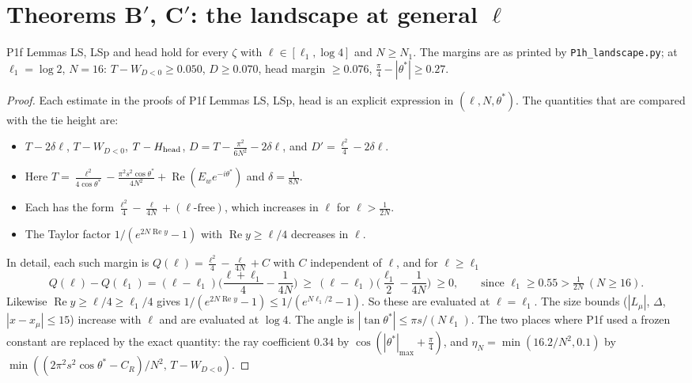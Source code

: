 \documentclass[11pt]{article}
\theoremstyle{remark}\newtheorem{remark}[theorem]{Remark}
\begin{document}
\section{Theorems B$'$, C$'$: the landscape at general $\ell$}\label{sec:LS}
\begin{lemma}[LS$(\ell_1)$; PROVED for $(\ell_1,N)=(\log2,\,N\ge16)$ and $(0.5522,\,N\ge17)$, computer-assisted]\label{lem:LS}
P1f Lemmas LS, LSp and head hold for every $\zeta$ with $\ell\in[\ell_1,\log4]$ and $N\ge N_1$. The margins are as printed by \texttt{P1h\_landscape.py}; at $\ell_1=\log2$, $N=16$: $T-W_{D<0}\ge0.050$, $D\ge0.070$, head margin $\ge0.076$, $\frac\pi4-|\theta^*|\ge0.27$.
\end{lemma}
\begin{proof}
Each estimate in the proofs of P1f Lemmas LS, LSp, head is an explicit expression in $(\ell,N,\theta^*)$. The quantities that are compared with the tie height are:
\begin{itemize}
\item $T-2\delta\ell$, $T-W_{D<0}$, $T-H_{\rm head}$, $D=T-\frac{\pi^2}{6N^2}-2\delta\ell$, and $D'=\frac{\ell^2}4-2\delta\ell$.
\item Here $T=\frac{\ell^2}{4\cos\theta^*}-\frac{\pi^2s^2\cos\theta^*}{4N^2}+\operatorname{Re}(E_we^{-i\theta^*})$ and $\delta=\frac1{8N}$.
\item Each has the form $\frac{\ell^2}4-\frac{\ell}{4N}+(\ell\text{-free})$, which increases in $\ell$ for $\ell>\frac1{2N}$.
\item The Taylor factor $1/(e^{2N\operatorname{Re}y}-1)$ with $\operatorname{Re}y\ge\ell/4$ decreases in $\ell$.
\end{itemize}
In detail, each such margin is $Q(\ell)=\frac{\ell^2}4-\frac{\ell}{4N}+C$ with $C$ independent of $\ell$, and for $\ell\ge\ell_1$
\[
Q(\ell)-Q(\ell_1)=(\ell-\ell_1)\Big(\frac{\ell+\ell_1}{4}-\frac1{4N}\Big)\ \ge\ (\ell-\ell_1)\Big(\frac{\ell_1}{2}-\frac1{4N}\Big)\ \ge0,
\qquad\text{since }\ell_1\ge0.55>\tfrac1{2N}\ (N\ge16).
\]
Likewise $\operatorname{Re}y\ge\ell/4\ge\ell_1/4$ gives $1/(e^{2N\operatorname{Re}y}-1)\le1/(e^{N\ell_1/2}-1)$.
So these are evaluated at $\ell=\ell_1$. The size bounds ($|L_\mu|$, $\Delta$, $|x-x_\mu|\le15$) increase with $\ell$ and are evaluated at $\log4$. The angle is $|\tan\theta^*|\le\pi s/(N\ell_1)$.
The two places where P1f used a frozen constant are replaced by the exact quantity: the ray coefficient $0.34$ by $\cos(|\theta^*|_{\max}+\frac\pi4)$, and $\eta_N=\min(16.2/N^2,0.1)$ by $\min((2\pi^2s^2\cos\theta^*-C_R)/N^2,\,T-W_{D<0})$.

\end{proof}
\end{document}
